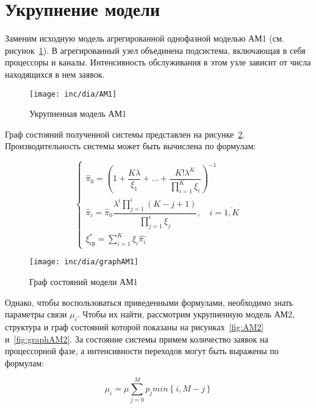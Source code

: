\documentclass[utf8x, 12pt]{G7-32} %
\begin{document}
\newpage

\section{Укрупнение модели}

Заменим исходную модель агрегированной однофазной моделью АМ1 (см. рисунок~\ref{fig:AM1}). В агрегированный узел объединена подсистема, включающая в себя процессоры и каналы. Интенсивность обслуживания в этом узле зависит от числа находящихся в нем заявок.

\begin{figure}[ht]
\centering
\texttt{[image: inc/dia/AM1]}
\caption{Укрупненная модель АМ1}
\label{fig:AM1}
\end{figure}

Граф состояний полученной системы представлен на рисунке~\ref{fig:graphAM1}. Производительность системы может быть вычислена по формулам:


\begin{equation}
\label{eq:AM1}
\left\{
   \begin{array}{lcl}
	\hat{\pi}_{0} = \left( 1 + \dfrac{K \lambda}{\xi_1} +  ... + \dfrac{K! \lambda^{K}}{\prod \limits_{i=1}^K \xi_i} \right) ^{-1} \\
	\hat{\pi}_{i} = \hat{\pi}_{0} \dfrac{\lambda^{i}\prod \limits_{j=1}^{i} (K-j+1)}{\prod \limits_{j=1}^i \xi_{j}}, \quad i = \overline{1,K}  \\ 
	\xi_{ср}^{*}=\sum \limits_{i=1}^K \xi_i \hat{\pi_i}
   \end{array}
\right.
\end{equation}


\begin{figure}[ht]
\centering
\texttt{[image: inc/dia/graphAM1]}
\caption{Граф состояний модели АМ1}
\label{fig:graphAM1}
\end{figure}

Однако, чтобы воспользоваться приведенными формулами, необходимо знать параметры связи $\mu_i$. Чтобы их найти, рассмотрим укрупненную модель АМ2, структура и граф состояний которой показаны на рисунках~\ref{fig:AM2} и~\ref{fig:graphAM2}. За состояние системы примем количество заявок на процессорной фазе, а интенсивности переходов могут быть выражены по формулам:

\begin{equation}
\label{eq:mu}
\mu_i = \mu \sum \limits_{j=0}^M p_j min \left\lbrace i, M-j \right\rbrace
\end{equation}
\end{document}

